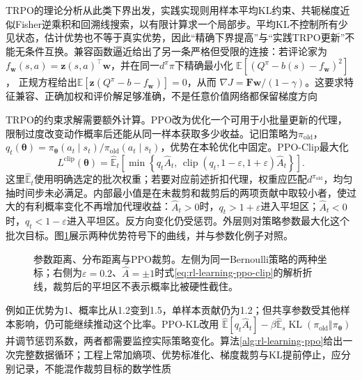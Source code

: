 TRPO的理论分析从此类下界出发，实践实现则用样本平均KL约束、共轭梯度近似Fisher逆乘积和回溯线搜索，以有限计算求一个局部步。平均KL不控制所有少见状态，估计优势也不等于真实优势，因此“精确下界提高”与“实践TRPO更新”不能无条件互换。兼容函数逼近给出了另一条严格但受限的连接：若评论家为
$f_{\bm w}(s,a)=\bm z(s,a)^\top\bm w$，并在同一$d^\pi\pi$下精确最小化
$\mathbb E[(Q^\pi-b(s)-f_{\bm w})^2]$，
正规方程给出$\mathbb E[\bm z(Q^\pi-b-f_{\bm w})]=0$，从而
$\nabla J=\bm F\bm w/(1-\gamma)$。这要求特征兼容、正确加权和评价解足够准确，不是任意价值网络都保留梯度方向

TRPO的约束求解需要额外计算。PPO改为优化一个可用于小批量更新的代理，限制过度改变动作概率后还能从同一样本获取多少收益。记旧策略为$\pi_{\mathrm{old}}$，
$q_t(\bm\theta)=\pi_{\bm\theta}(a_t\mid s_t)/
\pi_{\mathrm{old}}(a_t\mid s_t)$，优势在本轮优化中固定。PPO-Clip最大化
\begin{equation}
  L^{\mathrm{clip}}(\bm\theta)=
    \widehat{\mathbb E}_t
      \left[\min\left\{q_t\widehat A_t,\,
        \operatorname{clip}(q_t,1-\varepsilon,1+\varepsilon)
                      \widehat A_t\right\}\right].
  \label{eq:rl-learning-ppo-clip}
\end{equation}
这里$\widehat{\mathbb E}_t$使用明确选定的批次权重；若要对应前述折扣代理，权重应匹配$d^{\pi_{\mathrm{old}}}$，均匀抽时间步未必满足。内部最小值是在未裁剪和裁剪后的两项贡献中取较小者，使过大的有利概率变化不再增加代理收益：$\widehat A_t>0$时，$q_t>1+\varepsilon$进入平坦区；$\widehat A_t<0$时，$q_t<1-\varepsilon$进入平坦区。反方向变化仍受惩罚。外层则对策略参数最大化这个批次目标。图\ref{fig:rl-learning-policy-geometry}展示两种优势符号下的曲线，并与参数化例子对照。

\begin{figure}[t]
  \centering
  
  \caption{参数距离、分布距离与PPO裁剪。左侧为同一Bernoulli策略的两种坐标；右侧为$\varepsilon=0.2$、$\widehat A=\pm1$时式\eqref{eq:rl-learning-ppo-clip}的解析折线，裁剪后的平坦区不表示概率比被硬性截住。}
  \label{fig:rl-learning-policy-geometry}
\end{figure}

例如正优势为1、概率比从1.2变到1.5，单样本贡献仍为1.2；但共享参数受其他样本影响，仍可能继续推动这个比率。PPO-KL改用
$\widehat{\mathbb E}[q_t\widehat A_t]
-\beta\widehat{\mathbb E}_s\operatorname{KL}
(\pi_{\mathrm{old}}\Vert\pi_{\bm\theta})$
并调节惩罚系数，两者都需要监控实际策略变化。算法\ref{alg:rl-learning-ppo}给出一次完整数据循环；工程上常加熵项、优势标准化、梯度裁剪与KL提前停止，应分别记录，不能混作裁剪目标的数学性质

